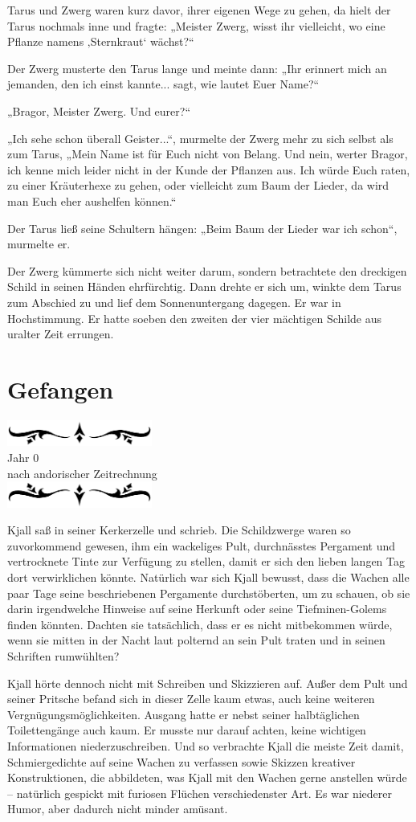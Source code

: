 \documentclass[10pt, a4paper, oneside]{book}
\newcommand{\az}[1]{%
    \begin{center}
        \includegraphics[width=180px]{Das Erbe des Wunderkindes/verzierung1.png}\\
        {\Huge #1} \\
        {nach andorischer Zeitrechnung}\\
        \includegraphics[width=180px]{Das Erbe des Wunderkindes/verzierung2.png}
    \end{center}
    \extramarks{}{#1 a.Z.}
}
\begin{document}
Tarus und Zwerg waren kurz davor, ihrer eigenen Wege zu gehen, da hielt der Tarus nochmals inne und fragte: „Meister Zwerg, wisst ihr vielleicht, wo eine Pflanze namens ‚Sternkraut‘ wächst?“

Der Zwerg musterte den Tarus lange und meinte dann: „Ihr erinnert mich an jemanden, den ich einst kannte... sagt, wie lautet Euer Name?“

„Bragor, Meister Zwerg. Und eurer?“

„Ich sehe schon überall Geister...“, murmelte der Zwerg mehr zu sich selbst als zum Tarus, „Mein Name ist für Euch nicht von Belang. Und nein, werter Bragor, ich kenne mich leider nicht in der Kunde der Pflanzen aus. Ich würde Euch raten, zu einer Kräuterhexe zu gehen, oder vielleicht zum Baum der Lieder, da wird man Euch eher aushelfen können.“

Der Tarus ließ seine Schultern hängen: „Beim Baum der Lieder war ich schon“, murmelte er.

Der Zwerg kümmerte sich nicht weiter darum, sondern betrachtete den dreckigen Schild in seinen Händen ehrfürchtig. Dann drehte er sich um, winkte dem Tarus zum Abschied zu und lief dem Sonnenuntergang dagegen. Er war in Hochstimmung. Er hatte soeben den zweiten der vier mächtigen Schilde aus uralter Zeit errungen.








\newpage
\section{Gefangen}

\az{Jahr 0}



Kjall saß in seiner Kerkerzelle und schrieb. Die Schildzwerge waren so zuvorkommend gewesen, ihm ein wackeliges Pult, durchnässtes Pergament und vertrocknete Tinte zur Verfügung zu stellen, damit er sich den lieben langen Tag dort verwirklichen könnte. Natürlich war sich Kjall bewusst, dass die Wachen alle paar Tage seine beschriebenen Pergamente durchstöberten, um zu schauen, ob sie darin irgendwelche Hinweise auf seine Herkunft oder seine Tiefminen-Golems finden könnten. Dachten sie tatsächlich, dass er es nicht mitbekommen würde, wenn sie mitten in der Nacht laut polternd an sein Pult traten und in seinen Schriften rumwühlten?

Kjall hörte dennoch nicht mit Schreiben und Skizzieren auf. Außer dem Pult und seiner Pritsche befand sich in dieser Zelle kaum etwas, auch keine weiteren Vergnügungsmöglichkeiten. Ausgang hatte er nebst seiner halbtäglichen Toilettengänge auch kaum. Er musste nur darauf achten, keine wichtigen Informationen niederzuschreiben. Und so verbrachte Kjall die meiste Zeit damit, Schmiergedichte auf seine Wachen zu verfassen sowie Skizzen kreativer Konstruktionen, die abbildeten, was Kjall mit den Wachen gerne anstellen würde – natürlich gespickt mit furiosen Flüchen verschiedenster Art. Es war niederer Humor, aber dadurch nicht minder amüsant.\bigskip
\end{document}
